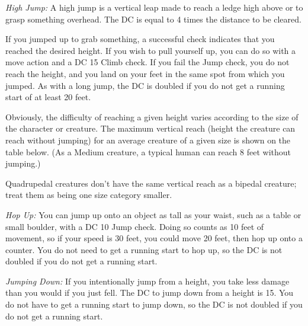 \textit{High Jump:} A high jump is a vertical leap made to reach a ledge high above or to grasp something overhead. The DC is equal to 4 times the distance to be cleared.

If you jumped up to grab something, a successful check indicates that you reached the desired height. If you wish to pull yourself up, you can do so with a move action and a DC 15 Climb check. If you fail the Jump check, you do not reach the height, and you land on your feet in the same spot from which you jumped. As with a long jump, the DC is doubled if you do not get a running start of at least 20 feet.


Obviously, the difficulty of reaching a given height varies according to the size of the character or creature. The maximum vertical reach (height the creature can reach without jumping) for an average creature of a given size is shown on the table below. (As a Medium creature, a typical human can reach 8 feet without jumping.)

Quadrupedal creatures don't have the same vertical reach as a bipedal creature; treat them as being one size category smaller.

\textit{Hop Up:} You can jump up onto an object as tall as your waist, such as a table or small boulder, with a DC 10 Jump check. Doing so counts as 10 feet of movement, so if your speed is 30 feet, you could move 20 feet, then hop up onto a counter. You do not need to get a running start to hop up, so the DC is not doubled if you do not get a running start.

\textit{Jumping Down:} If you intentionally jump from a height, you take less damage than you would if you just fell. The DC to jump down from a height is 15. You do not have to get a running start to jump down, so the DC is not doubled if you do not get a running start.

